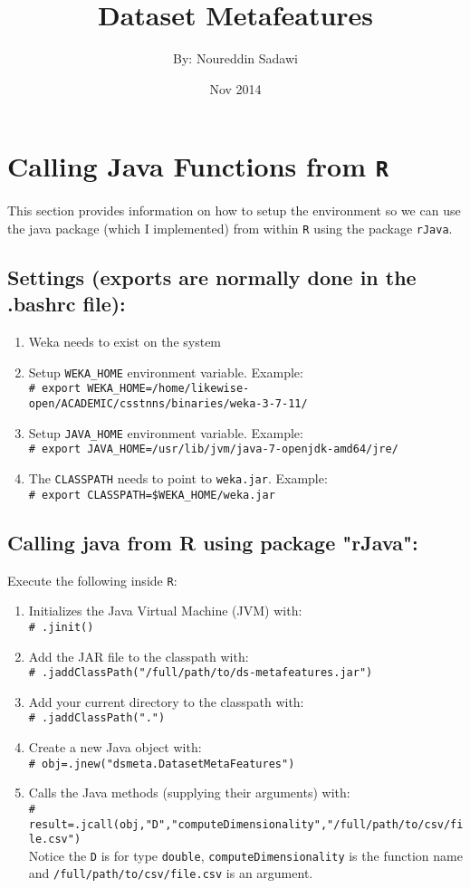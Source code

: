 \documentclass[a4paper,12pt, english]{article}
\newcommand{\shellcmd}[1]{\\\indent\indent\texttt{\footnotesize\# #1}\\}
\begin{document}
\title{Dataset Metafeatures}
\date{Nov 2014}
\author{By: Noureddin Sadawi}
\maketitle

\large
\section{Calling Java Functions from \texttt{R}}
This section provides information on how to setup the environment so we can use the java package (which I implemented) from within \texttt{R} using the package \texttt{rJava}.
\subsection{Settings (exports are normally done in the .bashrc file):}
\begin{enumerate}
	\item Weka needs to exist on the system
	\item Setup \texttt{WEKA\_HOME} environment variable. Example:
   	  \shellcmd{export WEKA\_HOME=/home/likewise-open/ACADEMIC/csstnns/binaries/weka-3-7-11/}

	\item Setup \texttt{JAVA\_HOME} environment variable. Example: 
	\shellcmd{export JAVA\_HOME=/usr/lib/jvm/java-7-openjdk-amd64/jre/}
	\item The \texttt{CLASSPATH} needs to point to \texttt{weka.jar}. Example:
	\shellcmd{export CLASSPATH=\$WEKA\_HOME/weka.jar}
\end{enumerate} 

\subsection{Calling java from R using package "rJava":}
Execute the following inside \texttt{R}:
\begin{enumerate}
	\item Initializes the Java Virtual Machine (JVM) with:\shellcmd{.jinit()}
	\item Add the JAR file to the classpath with:\shellcmd{.jaddClassPath("/full/path/to/ds-metafeatures.jar")}
	\item Add your current directory to the classpath with:\shellcmd{.jaddClassPath(".")}
	\item Create a new Java object with: \shellcmd{obj=.jnew("dsmeta.DatasetMetaFeatures")}
	\item Calls the Java methods (supplying their arguments) with:\shellcmd{result=.jcall(obj,"D","computeDimensionality","/full/path/to/csv/file.csv")}
	Notice the \texttt{D} is for type \texttt{double}, \texttt{computeDimensionality} is the function name and \texttt{/full/path/to/csv/file.csv} is an argument. 
\end{enumerate} 
\end{document}
